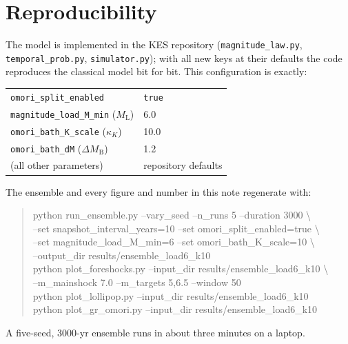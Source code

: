 \documentclass[11pt]{article}
\newcommand{\ML}{M_{\mathrm{L}}}
\newcommand{\dM}{\Delta M_{\mathrm{B}}}
\begin{document}
\section{Reproducibility}
\label{sec:repro}

The model is implemented in the KES repository (\texttt{magnitude\_law.py},
\texttt{temporal\_prob.py}, \texttt{simulator.py}); with all new keys at their defaults
the code reproduces the classical model bit for bit. This configuration is exactly:
\begin{center}
\small
\begin{tabular}{ll}
\toprule
\texttt{omori\_split\_enabled} & \texttt{true} \\
\texttt{magnitude\_load\_M\_min} ($\ML$) & 6.0 \\
\texttt{omori\_bath\_K\_scale} ($\kappa_K$) & 10.0 \\
\texttt{omori\_bath\_dM} ($\dM$) & 1.2 \\
(all other parameters) & repository defaults \\
\bottomrule
\end{tabular}
\end{center}
The ensemble and every figure and number in this note regenerate with:
\begin{quote}\small\ttfamily
python run\_ensemble.py --vary\_seed --n\_runs 5 --duration 3000 \textbackslash\\
\hspace*{1em}--set snapshot\_interval\_years=10 --set omori\_split\_enabled=true \textbackslash\\
\hspace*{1em}--set magnitude\_load\_M\_min=6 --set omori\_bath\_K\_scale=10 \textbackslash\\
\hspace*{1em}--output\_dir results/ensemble\_load6\_k10\\[4pt]
python plot\_foreshocks.py --input\_dir results/ensemble\_load6\_k10 \textbackslash\\
\hspace*{1em}--m\_mainshock 7.0 --m\_targets 5,6.5 --window 50\\
python plot\_lollipop.py --input\_dir results/ensemble\_load6\_k10\\
python plot\_gr\_omori.py --input\_dir results/ensemble\_load6\_k10
\end{quote}
A five-seed, 3000-yr ensemble runs in about three minutes on a laptop.
\end{document}
